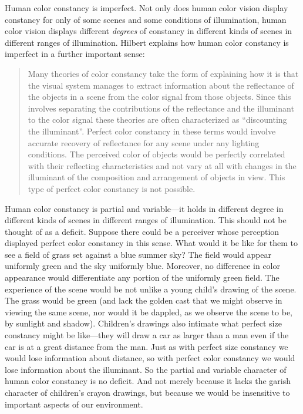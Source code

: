 \documentclass[12pt]{article}
\begin{document}
Human color constancy is imperfect. Not only does human color vision display constancy for only of some scenes and some conditions of illumination, human color vision displays different \emph{degrees} of constancy in different kinds of scenes in different ranges of illumination. Hilbert explains how human color constancy is imperfect in a further important sense:
	\begin{quote}
		Many theories of color constancy take the form of explaining how it is that the visual system manages to extract information about the reflectance of the objects in a scene from the color signal from those objects. Since this involves separating the contributions of the reflectance and the illuminant to the color signal these theories are often characterized as ``discounting the illuminant''. Perfect color constancy in these terms would involve accurate recovery of reflectance for any scene under any lighting conditions. The perceived color of objects would be perfectly correlated with their reflecting characteristics and not vary at all with changes in the illuminant of the composition and arrangement of objects in view. This type of perfect color constancy is not possible. \citep[143]{Hilbert:2007qy}
	\end{quote}

Human color constancy is partial and variable---it holds in different degree in different kinds of scenes in different ranges of illumination. This should not be thought of as a deficit. Suppose there could be a perceiver whose perception displayed perfect color constancy in this sense. What would it be like for them to see a field of grass set against a blue summer sky? The field would appear uniformly green and the sky uniformly blue. Moreover, no difference in color appearance would differentiate any portion of the uniformly green field. The experience of the scene would be not unlike a young child's drawing of the scene. The grass would be green (and lack the golden cast that we might observe in viewing the same scene, nor would it be dappled, as we observe the scene to be, by sunlight and shadow). Children's drawings also intimate what perfect size constancy might be like---they will draw a car as larger than a man even if the car is at a great distance from the man. Just as with perfect size constancy we would lose information about distance, so with perfect color constancy we would lose information about the illuminant. So the partial and variable character of human color constancy is no deficit. And not merely because it lacks the garish character of children's crayon drawings, but because we would be insensitive to important aspects of our environment.



 
 
\end{document}
